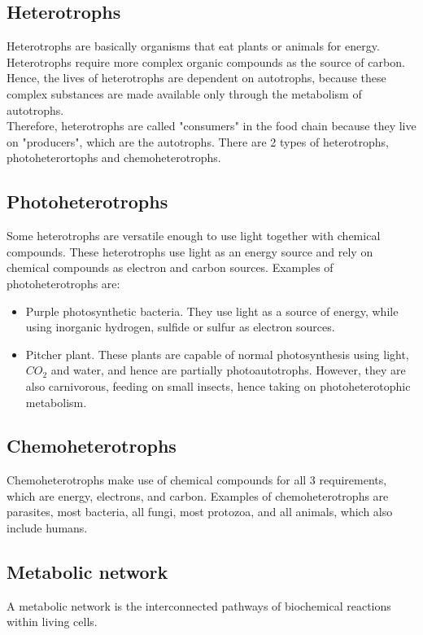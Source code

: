 \documentclass[11pt]{article}
\begin{document}
\subsection{Heterotrophs}
\label{sec:org60227e2}
Heterotrophs are basically organisms that eat plants or animals for energy. Heterotrophs require more complex organic compounds as the source of carbon. Hence, the lives of heterotrophs are dependent on autotrophs, because these complex substances are made available only through the metabolism of autotrophs.
\\[0pt]

Therefore, heterotrophs are called "consumers" in the food chain because they live on "producers", which are the autotrophs. There are 2 types of heterotrophs, photoheterortophs and chemoheterotrophs.

\subsection{Photoheterotrophs}
\label{sec:org1a10804}
Some heterotrophs are versatile enough to use light together with chemical compounds. These heterotrophs use light as an energy source and rely on chemical compounds as electron and carbon sources. Examples of photoheterotrophs are:
\begin{itemize}
\item Purple photosynthetic bacteria. They use light as a source of energy, while using inorganic hydrogen, sulfide or sulfur as electron sources.
\item Pitcher plant. These plants are capable of normal photosynthesis using light, \(CO_2\) and water, and hence are partially photoautotrophs. However, they are also carnivorous, feeding on small insects, hence taking on photoheterotophic metabolism.
\end{itemize}

\subsection{Chemoheterotrophs}
\label{sec:org2ea2a06}
Chemoheterotrophs make use of chemical compounds for all 3 requirements, which are energy, electrons, and carbon. Examples of chemoheterotrophs are parasites, most bacteria, all fungi, most protozoa, and all animals, which also include humans.

\subsection{Metabolic network}
\label{sec:org732869c}
A metabolic network is the interconnected pathways of biochemical reactions within living cells.
\end{document}
